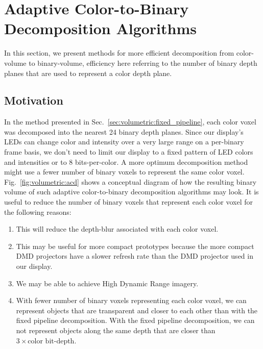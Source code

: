 \section{Adaptive Color-to-Binary Decomposition Algorithms}
\label{sec:volumetric:acd}

In this section, we present methods for more efficient decomposition from color-volume to binary-volume, efficiency here referring to the number of binary depth planes that are used to represent a color depth plane. 

\subsection{Motivation}

In the method presented in Sec.~\ref{sec:volumetric:fixed_pipeline}, each color voxel was decomposed into the nearest 24 binary depth planes. 
Since our display's LEDs can change color and intensity over a very large range on a per-binary frame basis, we don't need to limit our display to a fixed pattern of LED colors and intensities or to 8 bits-per-color. 
A more optimum decomposition method might use a fewer number of binary voxels to represent the same color voxel. 
Fig.~\ref{fig:volumetric:acd} shows a conceptual diagram of how the resulting binary volume of such adaptive color-to-binary decomposition algorithms may look.
It is useful to reduce the number of binary voxels that represent each color voxel for the following reasons:

\begin{enumerate}
    \item This will reduce the depth-blur associated with each color voxel.
    \item This may be useful for more compact prototypes because the more compact DMD projectors have a slower refresh rate than the DMD projector used in our display.
    \item We may be able to achieve High Dynamic Range imagery.
    \item With fewer number of binary voxels representing each color voxel, we can represent objects that are transparent and closer to each other than with the fixed pipeline decomposition. With the fixed pipeline decomposition, we can not represent objects along the same depth that are closer than $3 \times \text{color bit-depth}$.
\end{enumerate}


